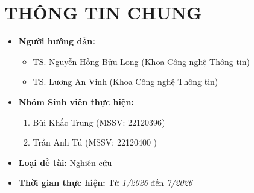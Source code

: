 \documentclass{article}[14pt]
\begin{document}
    \section{THÔNG TIN CHUNG}
    \begin{itemize}[label = {}]
        
        \item \textbf{Người hướng dẫn:} 
        \begin{itemize}
            \item TS. Nguyễn Hồng Bửu Long (Khoa Công nghệ Thông tin)
            \item TS. Lương An Vinh (Khoa Công nghệ Thông tin)
        \end{itemize}{}
    
        
        \item \textbf{Nhóm Sinh viên thực hiện:}
        
        \begin{enumerate}
        
            \item Bùi Khắc Trung (MSSV: 22120396)
            \item Trần Anh Tú (MSSV: 22120400 )
        \end{enumerate}

        \item \textbf{Loại đề tài:} Nghiên cứu
        
        \item \textbf{Thời gian thực hiện:} Từ \textit{1/2026} đến \textit{7/2026}
        
        
    \end{itemize}
    
    \pagebreak 
    
\end{document}
